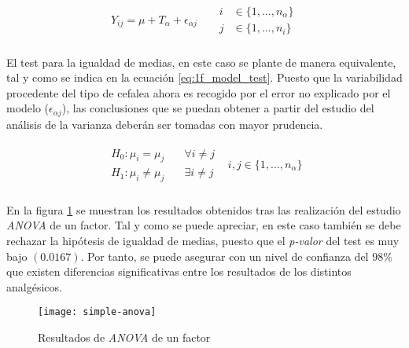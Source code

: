 \documentclass[11pt]{article}
\begin{document}
      \begin{align}
      \label{eq:1f_model}
        Y_{ij} = \mu + T_\alpha + \epsilon_{\alpha j}  &&
        \begin{split}
          i &\in \{1,...,n_\alpha\}\\
          j &\in \{1, ..., n_i\}
        \end{split}
      \end{align}

      \paragraph{}
      El test para la igualdad de medias, en este caso se plante de manera equivalente, tal y como se indica en la ecuación \eqref{eq:1f_model_test}. Puesto que la variabilidad procedente del tipo de cefalea ahora es recogido por el error no explicado por el modelo ($\epsilon_{\alpha j}$), las conclusiones que se puedan obtener a partir del estudio del análisis de la varianza deberán ser tomadas con mayor prudencia.

      \begin{align}
      \label{eq:1f_model_test}
        \begin{split}
          H_0: \mu_i = \mu_j &\quad  \forall i \neq j \\
          H_1: \mu_i \neq \mu_j &\quad  \exists i \neq j
        \end{split} & i,j\in \{1,...,n_{\alpha}\}
      \end{align}

      \paragraph{}
      En la figura \ref{fig:simple-anova-results} se muestran los resultados obtenidos tras las realización del estudio \emph{ANOVA} de un factor. Tal y como se puede apreciar, en este caso también se debe rechazar la hipótesis de igualdad de medias, puesto que el \emph{p-valor} del test es muy bajo $(0.0167)$. Por tanto, se puede asegurar con un nivel de confianza del $98\%$ que existen diferencias significativas entre los resultados de los distintos analgésicos.

      \begin{figure}[H]
        \centering
        \texttt{[image: simple-anova]}
        \caption{Resultados de \emph{ANOVA} de un factor}
        \label{fig:simple-anova-results}
      \end{figure}
\end{document}
